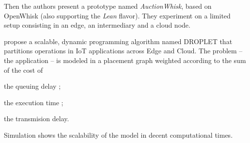 \documentclass[11pt]{sdm}
\begin{document}
\begin{description}
	Then the authors present a prototype named \emph{AuctionWhisk}, based on OpenWhisk (also supporting the \emph{Lean} flavor). They experiment on a limited setup consisting in an edge, an intermediary and a cloud node.
	
	\item[\citet{elgamal_droplet_2018}] propose a scalable, dynamic programming algorithm named DROPLET that partitions operations in \gls{IoT} applications across Edge and Cloud. The problem -- the application -- is modeled in a placement graph weighted according to the sum of the cost of
	\begin{enumerate*}[(i)]
		\item the queuing delay ;
		\item the execution time ;
		\item the transmision delay.
	\end{enumerate*}
	Simulation shows the scalability of the model in decent computational times.

\end{description}









\end{document}
